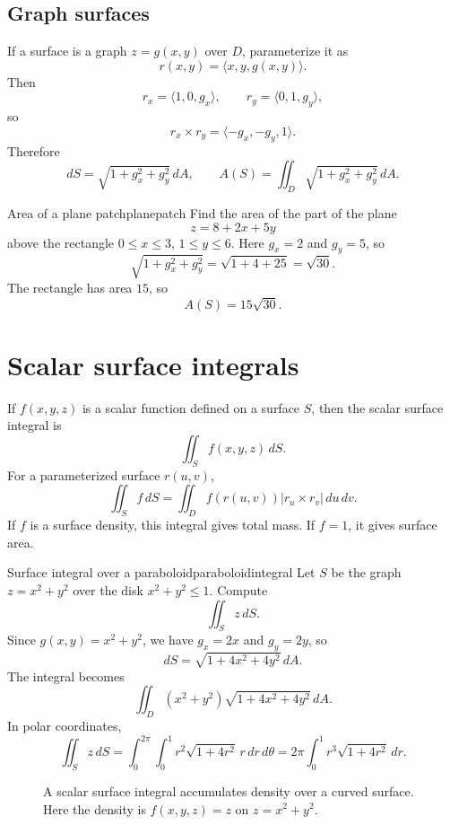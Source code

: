 \documentclass[11pt]{article}
\newcommand{\dS}{\,dS}
\newcommand{\dA}{\,dA}
\newcommand{\du}{\,du}
\newcommand{\dv}{\,dv}
\begin{document}
\subsection*{Graph surfaces}
If a surface is a graph $z=g(x,y)$ over $D$, parameterize it as
\[
r(x,y)=\langle x,y,g(x,y)\rangle.
\]
Then
\[
r_x=\langle 1,0,g_x\rangle,\qquad r_y=\langle 0,1,g_y\rangle,
\]
so
\[
r_x\times r_y=\langle -g_x,-g_y,1\rangle.
\]
Therefore
\[
dS=\sqrt{1+g_x^2+g_y^2}\dA,
\qquad
A(S)=\iint_D \sqrt{1+g_x^2+g_y^2}\dA.
\]

\begin{examplebox}{Area of a plane patch}{planepatch}
Find the area of the part of the plane
\[
z=8+2x+5y
\]
above the rectangle $0\le x\le 3$, $1\le y\le 6$.
Here $g_x=2$ and $g_y=5$, so
\[
\sqrt{1+g_x^2+g_y^2}=\sqrt{1+4+25}=\sqrt{30}.
\]
The rectangle has area $15$, so
\[
A(S)=15\sqrt{30}.
\]
\end{examplebox}

\section{Scalar surface integrals}

If $f(x,y,z)$ is a scalar function defined on a surface $S$, then the scalar surface integral is
\[
\iint_S f(x,y,z)\dS.
\]
For a parameterized surface $r(u,v)$,
\[
\iint_S f\dS=\iint_D f(r(u,v))|r_u\times r_v|\du\dv.
\]
If $f$ is a surface density, this integral gives total mass. If $f=1$, it gives surface area.

\begin{examplebox}{Surface integral over a paraboloid}{paraboloidintegral}
Let $S$ be the graph $z=x^2+y^2$ over the disk $x^2+y^2\le 1$. Compute
\[
\iint_S z\dS.
\]
Since $g(x,y)=x^2+y^2$, we have $g_x=2x$ and $g_y=2y$, so
\[
dS=\sqrt{1+4x^2+4y^2}\dA.
\]
The integral becomes
\[
\iint_D (x^2+y^2)\sqrt{1+4x^2+4y^2}\dA.
\]
In polar coordinates,
\[
\iint_S z\dS=\int_0^{2\pi}\int_0^1 r^2\sqrt{1+4r^2}\,r\,dr\,d\theta
=2\pi\int_0^1 r^3\sqrt{1+4r^2}\,dr.
\]
\end{examplebox}

\begin{figure}[H]
\centering
{}
\caption{A scalar surface integral accumulates density over a curved surface. Here the density is $f(x,y,z)=z$ on $z=x^2+y^2$.}
\end{figure}
\end{document}
